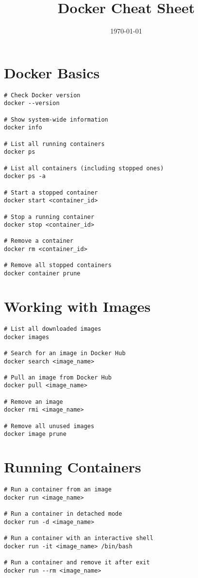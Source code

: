 \documentclass[11pt]{article}
\title{\textbf{Docker Cheat Sheet}}
\author{}
\date{\today}
\begin{document}
    \maketitle

    \section*{Docker Basics}
    \begin{lstlisting}[style=dockerstyle]
# Check Docker version
docker --version

# Show system-wide information
docker info

# List all running containers
docker ps

# List all containers (including stopped ones)
docker ps -a

# Start a stopped container
docker start <container_id>

# Stop a running container
docker stop <container_id>

# Remove a container
docker rm <container_id>

# Remove all stopped containers
docker container prune
    \end{lstlisting}

    \section*{Working with Images}
    \begin{lstlisting}[style=dockerstyle]
# List all downloaded images
docker images

# Search for an image in Docker Hub
docker search <image_name>

# Pull an image from Docker Hub
docker pull <image_name>

# Remove an image
docker rmi <image_name>

# Remove all unused images
docker image prune
    \end{lstlisting}

    \section*{Running Containers}
    \begin{lstlisting}[style=dockerstyle]
# Run a container from an image
docker run <image_name>

# Run a container in detached mode
docker run -d <image_name>

# Run a container with an interactive shell
docker run -it <image_name> /bin/bash

# Run a container and remove it after exit
docker run --rm <image_name>
    \end{lstlisting}
\end{document}
